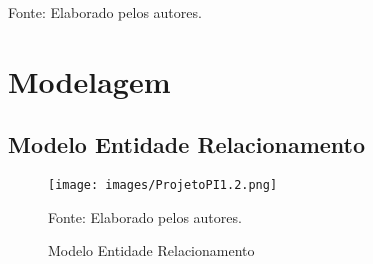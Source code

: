 \documentclass[
    12pt,               %
    openright,          %
    oneside,
    a4paper,            %
    BIBLATEX,           %
    TODO,               %
    english,            %
    brazil              %
    ]{ifsp-spo-inf-ctds}
\begin{document}
\begin{center}
\begin{quadro}[H]
        \label{tab:hist_usuario}
        \centering
        {\footnotesize Fonte: Elaborado pelos autores.}
        \end{quadro}
    \end{center}  

    \section{Modelagem}

        \subsection{Modelo Entidade Relacionamento}

            \begin{figure}[H]
            \centering
                \caption{Modelo Entidade Relacionamento}
                \texttt{[image: images/ProjetoPI1.2.png]}

                \label{fig:MER2}
                \centering
                {\footnotesize Fonte: Elaborado pelos autores.}
            \end{figure}
\end{document}
